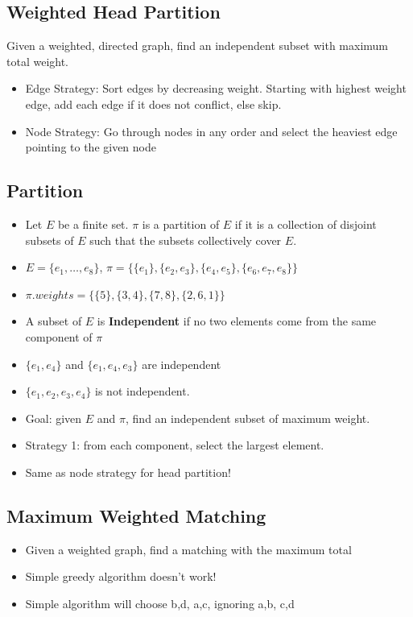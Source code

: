 \documentclass[12pt, letter]{article}
\begin{document}
\subsection*{Weighted Head Partition}
Given a weighted, directed graph, find an independent subset with maximum total weight.
\begin{itemize}
    \item Edge Strategy: Sort edges by decreasing weight. Starting with highest weight edge, add each edge if it does not conflict, else skip.
    \item Node Strategy: Go through nodes in any order and select the heaviest edge pointing to the given node
\end{itemize}

\subsection*{Partition}
\begin{itemize}
    \item Let $E$ be a finite set. $\pi$ is a partition of $E$ if it is a collection of disjoint subsets of $E$ such that the subsets collectively cover $E$.
    \item $E = \{e_1, \ldots, e_8\}$, $\pi = \big\{\{e_1\}, \{e_2, e_3\}, \{e_4, e_5\}, \{e_6, e_7, e_8\}\big\}$
    \item $\pi.weights = \big\{\{5\}, \{3, 4\}, \{7, 8\}, \{2, 6, 1\}\big\}$
    \item A subset of $E$ is \textbf{Independent} if no two elements come from the same component of $\pi$ 
    \item $\{e_1,e_4\}$ and $\{e_1,e_4,e_3\}$ are independent
    \item $\{e_1, e_2, e_3, e_4\}$ is not independent.
    \item Goal: given $E$ and $\pi$, find an independent subset of maximum weight.
    \item Strategy 1: from each component, select the largest element.
    \item Same as node strategy for head partition!

\end{itemize}

\subsection*{Maximum Weighted Matching}
\begin{itemize}
    \item Given a weighted graph, find a matching with the maximum total
    \item Simple greedy algorithm doesn't work!
    \item Simple algorithm will choose {{b,d}, {a,c}}, ignoring {{a,b}, {c,d}}
\end{itemize}
\end{document}
